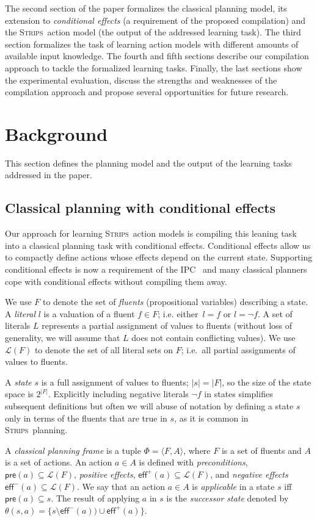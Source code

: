 \documentclass[letterpaper]{article} %
\newcommand{\tup}[1]{{\langle #1 \rangle}}
\newcommand{\pre}{\mathsf{pre}}     %
\newcommand{\eff}{\mathsf{eff}}     %
\newcommand{\strips}{\textsc{Strips}}     %
\begin{document}
The second section of the paper formalizes the classical planning model, its extension to {\em conditional effects} (a requirement of the proposed compilation) and the \strips\ action model (the output of the addressed learning task). The third section formalizes the task of learning action models with different amounts of available input knowledge. The fourth and fifth sections describe our compilation approach to tackle the formalized learning tasks. Finally, the last sections show the experimental evaluation, discuss the strengths and weaknesses of the compilation approach and propose several opportunities for future research.


\section{Background}
This section defines the planning model and the output of the learning tasks addressed in the paper.

\subsection{Classical planning with conditional effects}
Our approach for learning \strips\ action models is compiling this leaning task into a classical planning task with conditional effects. Conditional effects allow us to compactly define actions whose effects depend on the current state. Supporting conditional effects is now a requirement of the IPC~\cite{vallati:IPC:AIM2015} and many classical planners cope with conditional effects without compiling them away.

We use $F$ to denote the set of {\em fluents} (propositional variables) describing a state. A {\em literal} $l$ is a valuation of a fluent $f\in F$; i.e. either~$l=f$ or $l=\neg f$. A set of literals $L$ represents a partial assignment of values to fluents (without loss of generality, we will assume that $L$ does not contain conflicting values). We use $\mathcal{L}(F)$ to denote the set of all literal sets on $F$; i.e.~all partial assignments of values to fluents.

A {\em state} $s$ is a full assignment of values to fluents; $|s|=|F|$, so the size of the state space is $2^{|F|}$. Explicitly including negative literals $\neg f$ in states simplifies subsequent definitions but often we will abuse of notation by defining a state $s$ only in terms of the fluents that are true in $s$, as it is common in \strips\ planning.

A {\em classical planning frame} is a tuple $\Phi=\tup{F,A}$, where $F$ is a set of fluents and $A$ is a set of actions. An action $a\in A$ is defined with {\em preconditions}, $\pre(a)\subseteq\mathcal{L}(F)$, {\em positive effects}, $\eff^+(a)\subseteq\mathcal{L}(F)$, and {\em negative effects} $\eff^-(a)\subseteq\mathcal{L}(F)$. We say that an action $a\in A$ is {\em applicable} in a state $s$ iff $\pre(a)\subseteq s$. The result of applying $a$ in $s$ is the {\em successor state} denoted by $\theta(s,a)=\{s\setminus\eff^-(a))\cup\eff^+(a)\}$.
\end{document}
